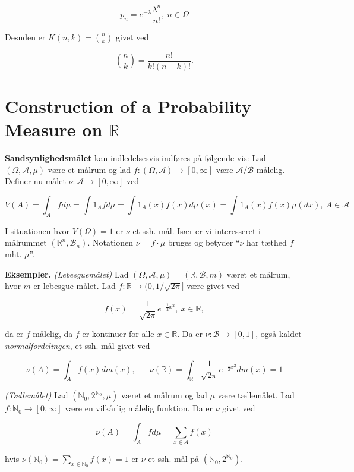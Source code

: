 \documentclass[
]{book}
\begin{document}
\[
p_n=e^{-\lambda}\frac{\lambda^n}{n!},\ n\in\Omega
\]

Desuden er \(K(n,k)={n\choose k}\) givet ved

\[
{n\choose k}=\frac{n!}{k!(n-k)!}.
\]

\hypertarget{construction-of-a-probability-measure-on-mathbb-r}{%
\section{\texorpdfstring{Construction of a Probability Measure on \(\mathbb R\)}{Construction of a Probability Measure on \textbackslash mathbb R}}\label{construction-of-a-probability-measure-on-mathbb-r}}

\textbf{Sandsynlighedsmålet} kan indledelsesvis indføres på følgende vis: Lad \((\Omega, \mathcal{A},\mu)\) være et målrum og lad \(f : (\Omega,\mathcal{A}) \to [0,\infty]\) være \(\mathcal{A}/\mathcal{B}\)-målelig. Definer nu målet \(\nu : \mathcal{A} \to [0,\infty]\) ved

\[
V(A)=\int_A f d\mu=\int 1_A fd\mu=\int 1_A(x)f(x)d\mu(x)=\int1_A(x)f(x)\mu(dx),\ A\in\mathcal{A}
\]

I situationen hvor \(V(\Omega)=1\) er \(\nu\) et ssh. mål. Især er vi interesseret i målrummet \((\mathbb{R}^n,\mathcal{B}_n)\). Notationen \(\nu =f\cdot \mu\) bruges og betyder ``\(\nu\) har tæthed \(f\) mht. \(\mu\)''.

\textbf{Eksempler.} \emph{(Lebesguemålet)} Lad \((\Omega,\mathcal{A},\mu)=(\mathbb{R},\mathcal{B},m)\) været et målrum, hvor \(m\) er lebesgue-målet. Lad \(f : \mathbb{R}\to (0,1/\sqrt{2\pi}]\) være givet ved

\[
f(x)=\frac{1}{\sqrt{2\pi}}e^{-\frac{1}{2}x^2},\ x\in\mathbb{R},
\]

da er \(f\) målelig, da \(f\) er kontinuer for alle \(x\in\mathbb{R}\). Da er \(\nu : \mathcal{B} \to [0,1]\), også kaldet \emph{normalfordelingen}, et ssh. mål givet ved

\[
\nu(A)=\int_A f(x) dm(x),\hspace{20pt} \nu(\mathbb{R})=\int_{\mathbb{R}}\frac{1}{\sqrt{2\pi}}e^{-\frac{1}{2}x^2}dm(x)=1
\]

\emph{(Tællemålet)} Lad \((\mathbb{N}_0,2^{\mathbb{N}_0},\mu)\) været et målrum og lad \(\mu\) være tællemålet. Lad \(f : \mathbb{N}_0 \to [0,\infty]\) være en vilkårlig målelig funktion. Da er \(\nu\) givet ved

\[
\nu(A)=\int_A fd\mu=\sum_{x\in A}f(x)
\]

hvis \(\nu(\mathbb{N}_0)=\sum_{x\in\mathbb{N}_0}f(x)=1\) er \(\nu\) et ssh. mål på \((\mathbb{N}_0,2^{\mathbb{N}_0})\).
\end{document}
